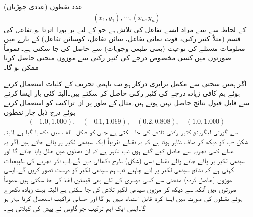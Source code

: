  عدد نقطوں (عددی جوڑیاں)
\begin{align*}
(x_1,y_1),\cdots,(x_n,y_n)
\end{align*}
کے لحاظ سے  سے مراد ایسے تفاعل  کی تلاش ہے  جو   کے لئے  پر پورا اترتا ہو۔تفاعل کی قسم (مثلاً کثیر رکنی، قوت نمائی تفاعل، سائن تفاعل، کوسائن تفاعل) کے بارے میں معلومات مسئلے کی نوعیت (یعنی طبعی وجوہات) سے حاصل کی جا سکتی ہے۔عموماً صورتوں میں کسی مخصوص درجے کی کثیر رکنی سے  موزوں منحنی حاصل کرنا ممکن ہو گا۔

 اگر ہمیں  سختی سے  مکمل برابری   درکار ہو تب باہمی تحریف کے کلیات استعمال کرتے ہوئے  ہم کافی زیادہ درجے کی کثیر رکنی  حاصل کر سکتے ہیں۔البتہ کئی بار ایسا کرنے سے  قابل قبول نتائج حاصل نہیں ہوتے ہیں۔مثال کے طور پر ان تراکیب کو استعمال کرتے ہوئے درج ذیل چار نقطوں
\begin{align}\label{مساوات_خطی_اعدادی_کمتر_مربع_شرائط_الف}
(-1.0,1.000),\quad (-0.1,1.099),\quad (0.2,0.808),\quad (1.0,1.000)
\end{align}
سے گزرتی لیگرینج کثیر رکنی  تلاش کی جا سکتی ہے جس کو شکل -الف میں دکھایا گیا ہے۔البتہ شکل -ب کو دیکھ کر صاف ظاہر ہوتا ہے کہ یہ نقطے تقریباً ایک سیدھی لکیر پر پائے جاتے ہیں۔اگر یہ نقطے کسی تجربہ سے حاصل کیے گئے ہوں تب ظاہر ہے کہ ان نقطوں میں خلل پایا جائے گا اور سیدھی لکیر پر پائے جانے والے نقطے اسی  (شکل) طرح دکھائی دیں گے۔اب اگر تجربے کی طبیعیات کہتی ہے کہ نتائج سیدھی لکیر پر آنے چاہیے تب ہم سیدھی لکیر کو درست تصور کریں گے۔ایسی موزوں (حاصل کردہ) منحنی سے کسی دوسری  کے لئے بھی قیمتیں اخذ کی جا سکتی ہیں۔عموماً صورتوں میں آنکھ سے دیکھ کر موزوں سیدھی لکیر تلاش کی جا سکتی ہے البتہ بہت زیادہ بکھرے  ہوئے نقطوں کی صورت میں ایسا کرنا قابل اعتماد نہیں ہو گا اور حسابی تراکیب استعمال کرنا بہتر ہو گا۔ایسی ایک اہم ترکیب جو گاوس نے پیش کی   کہلاتی ہے۔
